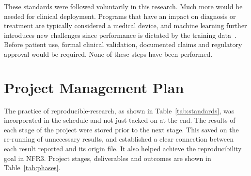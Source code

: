 These standards were followed voluntarily in this research. Much more would be needed for
clinical deployment. Programs that have an impact on diagnosis or treatment are typically
considered a medical device, and machine learning further introduces new challenges since
performance is dictated by the training data~\cite{Duggirala2025}. Before patient use, formal
clinical validation, documented claims and regulatory approval would be required. None of these
steps have been performed.

\section{Project Management Plan}
\label{sec:planning}

The practice of reproducible-research, as shown in Table~\ref{tab:standards}, was incorporated
in the schedule and not just tacked on at the end. The results of each stage of the project
were stored prior to the next stage. This saved on the re-running of unnecessary results, and
established a clear connection between each result reported and its origin file. It also helped
achieve the reproducibility goal in NFR3. Project stages, deliverables and outcomes are shown
in Table~\ref{tab:phases}.

